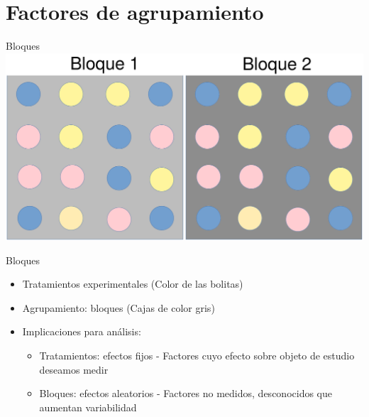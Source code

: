 \documentclass[
  11pt,
  ignorenonframetext,
]{beamer}
\begin{document}
\hypertarget{factores-de-agrupamiento}{%
\section{Factores de agrupamiento}\label{factores-de-agrupamiento}}

\begin{frame}{Bloques}
\protect\hypertarget{bloques}{}
\includegraphics{Figuras-disenos/Rejilla-bloques.png}
\end{frame}

\begin{frame}{Bloques}
\protect\hypertarget{bloques-1}{}
\begin{itemize}
\item
  Tratamientos experimentales (Color de las bolitas)
\item
  Agrupamiento: bloques (Cajas de color gris)
\item
  Implicaciones para análisis:

  \begin{itemize}
  \item
    Tratamientos: efectos fijos - Factores cuyo efecto sobre objeto de
    estudio deseamos medir
  \item
    Bloques: efectos aleatorios - Factores no medidos, desconocidos que
    aumentan variabilidad
  \end{itemize}
\end{itemize}
\end{frame}
\end{document}
